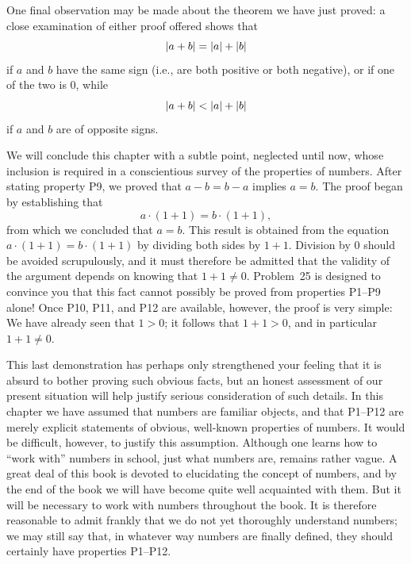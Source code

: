 One final observation may be made about the theorem we have just proved: a
close examination of either proof offered shows that
\[ \lvert a+b\rvert = \lvert a\rvert+\lvert b\rvert \]
if $a$ and $b$ have the same sign (i.e., are both positive or both negative),
or if one of the two is $0$, while
\[ \lvert a+b\rvert < \lvert a\rvert+\lvert b\rvert \]
if $a$ and $b$ are of opposite signs.

We will conclude this chapter with a subtle point, neglected until now, whose
inclusion is required in a conscientious survey of the properties of numbers.
After stating property P9, we proved that $a-b=b-a$ implies $a=b$. The proof
began by establishing that
\[ a \cdot (1+1) = b \cdot (1+1), \]
from which we concluded that $a=b$. This result is obtained from the equation
$a \cdot (1+1) = b \cdot (1+1)$ by dividing both sides by $1+1$. Division by
$0$ should be avoided scrupulously, and it must therefore be admitted that the
validity of the argument depends on knowing that $1+1 \neq 0$. Problem~25 is
designed to convince you that this fact cannot possibly be proved from
properties P1--P9 alone! Once P10, P11, and P12 are available, however, the
proof is very simple: We have already seen that $1>0$; it follows that
$1+1>0$, and in particular $1+1 \neq 0$.

This last demonstration has perhaps only strengthened your feeling that it is
absurd to bother proving such obvious facts, but an honest assessment of our
present situation will help justify serious consideration of such details. In
this chapter we have assumed that numbers are familiar objects, and that
P1--P12 are merely explicit statements of obvious, well-known properties of
numbers. It would be difficult, however, to justify this assumption. Although
one learns how to ``work with'' numbers in school, just what numbers are,
remains rather vague. A great deal of this book is devoted to elucidating the
concept of numbers, and by the end of the book we will have become quite well
acquainted with them. But it will be necessary to work with numbers
throughout the book. It is therefore reasonable to admit frankly that we do
not yet thoroughly understand numbers; we may still say that, in whatever way
numbers are finally defined, they should certainly have properties P1--P12.

